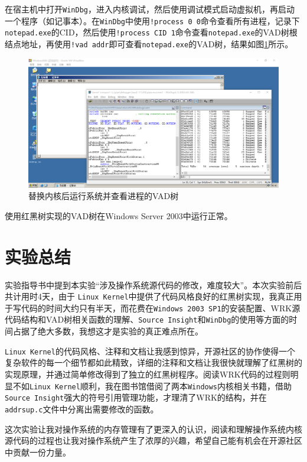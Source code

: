 \documentclass[a4paper, 11pt]{article}
\begin{document}
        在宿主机中打开\texttt{WinDbg}，进入内核调试，然后使用调试模式启动虚拟机，再启动一个程序（如记事本）。在\texttt{WinDbg}中使用\texttt{!process 0 0}命令查看所有进程，记录下\texttt{notepad.exe}的CID，然后使用\texttt{!process CID 1}命令查看\texttt{notepad.exe}的VAD树根结点地址，再使用\texttt{!vad addr}即可查看\texttt{notepad.exe}的VAD树\cite{WinInternal}，结果如图\ref{fig:vad4notepad}所示。
        \begin{figure}[htb]
            \centering
            \includegraphics[width=\textwidth]{images/vad4notepad.png}
            \caption{替换内核后运行系统并查看进程的VAD树}
            \label{fig:vad4notepad}
        \end{figure}

        使用红黑树实现的VAD树在Windows Server 2003中运行正常。

    \section{实验总结}
        实验指导书中提到本实验“涉及操作系统源代码的修改，难度较大”。本次实验前后共计用时4天，由于        \texttt{Linux Kernel}中提供了代码风格良好的红黑树实现，我真正用于写代码的时间大约只有半天，而花费在\texttt{Windows 2003 SP1}的安装配置、WRK源代码结构和VAD树相关函数的理解、\texttt{Source Insight}和\texttt{WinDbg}的使用等方面的时间占据了绝大多数，我想这才是实验的真正难点所在。
        
        \texttt{Linux Kernel}的代码风格、注释和文档让我感到惊异，开源社区的协作使得一个复杂软件的每一个细节都如此精致，详细的注释和文档让我很快就理解了红黑树的实现原理，并通过简单修改得到了独立的红黑树程序。阅读WRK代码的过程则明显不如\texttt{Linux Kernel}顺利，我在图书馆借阅了两本\texttt{Windows}内核相关书籍，借助\texttt{Source Insight}强大的符号引用管理功能，才理清了WRK的结构，并在\texttt{addrsup.c}文件中分离出需要修改的函数。
        
        这次实验让我对操作系统的内存管理有了更深入的认识，阅读和理解操作系统内核源代码的过程也让我对操作系统产生了浓厚的兴趣，希望自己能有机会在开源社区中贡献一份力量。

    
    
\end{document}
